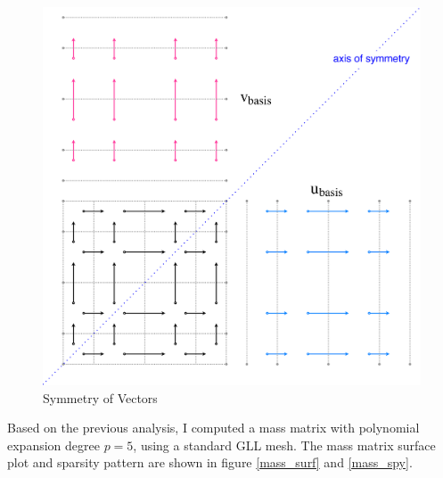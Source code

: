 \begin{figure}[H]
	\centering
	\includegraphics[width=.85\textwidth]{basis_symmetry}
	\caption{Symmetry of Vectors}
	\label{symm_basis}
\end{figure}  
Based on the previous analysis, I computed a mass matrix with polynomial expansion degree $p=5$, using a standard GLL mesh. The mass matrix surface plot and sparsity pattern are shown in figure \ref{mass_surf} and \ref{mass_spy}.\\
